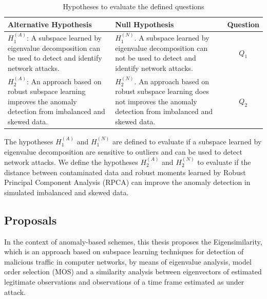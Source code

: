 \begin{table}[htb]
	\centering
	\caption{Hypotheses to evaluate the defined questions}
	\label{tab:hypothesis}
    \begin{tabular}{|p{6cm}|p{6cm}|c|} \hline
        \textbf{Alternative Hypothesis}	&\textbf{Null Hypothesis}	&\textbf{Question} 	\\ \hline
        $H_1^{(A)}$: A subspace learned by eigenvalue decomposition can be used to detect and identify network attacks.
        &$H_1^{(N)}$. A subspace learned by eigenvalue decomposition can not be used to detect and identify network attacks.	&$Q_1$\\ \hline
        $H_2^{(A)}$: An approach based on robust subspace learning improves the anomaly detection from imbalanced and skewed data.	&$H_2^{(N)}$. An approach based on robust subspace learning does not improves the anomaly detection from imbalanced and skewed data.	&$Q_2$\\ \hline
    \end{tabular}
\end{table}

The hypotheses $H_1^{(A)}$ and $H_1^{(N)}$ are defined to evaluate if a subspace learned by eigenvalue decomposition are sensitive to outliers and can be used to detect network attacks. We define the hypotheses $H_2^{(A)}$ and $H_2^{(N)}$ to evaluate if the distance between contaminated data and robust moments learned by Robust Principal Component Analysis (RPCA) can improve the anomaly detection in simulated imbalanced and skewed data. 


\subsection{Proposals}
\label{sec:1_proposals}

In the context of anomaly-based schemes, this thesis proposes the Eigensimilarity, which is an approach based on subspace learning techniques for detection of malicious traffic in computer networks, by means of eigenvalue analysis, model order selection (MOS) and a similarity analysis between eigenvectors of estimated legitimate observations and observations of a time frame estimated as under attack.

